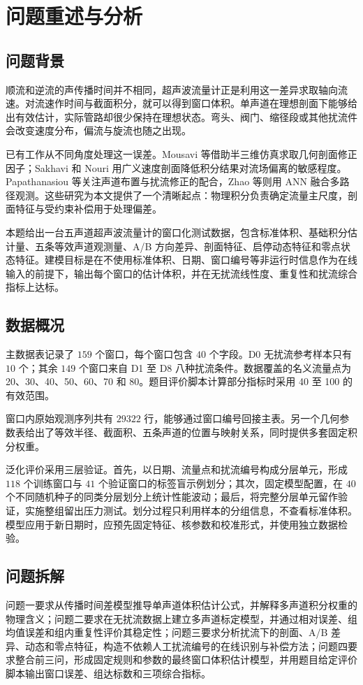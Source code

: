 \section{问题重述与分析}

\subsection{问题背景}

顺流和逆流的声传播时间并不相同，超声波流量计正是利用这一差异求取轴向流速。对流速作时间与截面积分，就可以得到窗口体积。单声道在理想剖面下能够给出有效估计，实际管路却很少保持在理想状态。弯头、阀门、缩径段或其他扰流件会改变速度分布，偏流与旋流也随之出现。

已有工作从不同角度处理这一误差。Mousavi 等借助半三维仿真求取几何剖面修正因子；Sakhavi 和 Nouri 用广义速度剖面降低积分结果对流场偏离的敏感程度。Papathanasiou 等关注声道布置与扰流修正的配合，Zhao 等则用 ANN 融合多路径观测\cite{Mousavi2020FPCF,Sakhavi2022GeneralizedProfile,Papathanasiou2022FlowDC,Zhao2014ANN}。这些研究为本文提供了一个清晰起点：物理积分负责确定流量主尺度，剖面特征与受约束补偿用于处理偏差。

本题给出一台五声道超声波流量计的窗口化测试数据，包含标准体积、基础积分估计量、五条等效声道观测量、A/B 方向差异、剖面特征、启停动态特征和零点状态特征。建模目标是在不使用标准体积、日期、窗口编号等非运行时信息作为在线输入的前提下，输出每个窗口的估计体积，并在无扰流线性度、重复性和扰流综合指标上达标。

\subsection{数据概况}

主数据表记录了 $159$ 个窗口，每个窗口包含 $40$ 个字段。D0 无扰流参考样本只有 $10$ 个；其余 $149$ 个窗口来自 D1 至 D8 八种扰流条件。数据覆盖的名义流量点为 20、30、40、50、60、70 和 80。题目评价脚本计算部分指标时采用 40 至 100 的有效范围。

窗口内原始观测序列共有 $29322$ 行，能够通过窗口编号回接主表。另一个几何参数表给出了等效半径、截面积、五条声道的位置与映射关系，同时提供多套固定积分权重。

泛化评价采用三层验证。首先，以日期、流量点和扰流编号构成分层单元，形成 $118$ 个训练窗口与 $41$ 个验证窗口的标签盲示例划分；其次，固定模型配置，在 $40$ 个不同随机种子的同类分层划分上统计性能波动；最后，将完整分层单元留作验证，实施整组留出压力测试。划分过程只利用样本的分组信息，不查看标准体积。模型应用于新日期时，应预先固定特征、核参数和校准形式，并使用独立数据检验。

\subsection{问题拆解}

问题一要求从传播时间差模型推导单声道体积估计公式，并解释多声道积分权重的物理含义；问题二要求在无扰流数据上建立多声道标定模型，并通过相对误差、组均值误差和组内重复性评价其稳定性；问题三要求分析扰流下的剖面、A/B 差异、动态和零点特征，构造不依赖人工扰流编号的在线识别与补偿方法；问题四要求整合前三问，形成固定规则和参数的最终窗口体积估计模型，并用题目给定评价脚本输出窗口误差、组达标数和三项综合指标。
